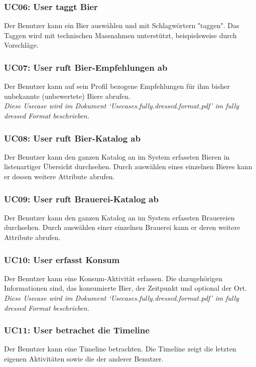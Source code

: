 \documentclass[10pt,a4paper]{scrartcl}
\begin{document}
\subsubsection*{UC06: User taggt Bier}
Der Benutzer kann ein Bier auswählen und mit Schlagwörtern "taggen". Das Taggen wird mit technischen Massnahmen unterstützt, beispielsweise durch Vorschläge.

\subsubsection*{UC07: User ruft Bier-Empfehlungen ab}
Der Benutzer kann auf sein Profil bezogene Empfehlungen für ihm bisher unbekannte (unbewertete) Biere abrufen.\\
\textit{Diese Usecase wird im Dokument `Usecases.fully.dressed.format.pdf' im fully dressed Format beschrieben.}

\subsubsection*{UC08: User ruft Bier-Katalog ab}
Der Benutzer kann den ganzen Katalog an im System erfassten Bieren in listenartiger Übersicht durchsehen. Durch auswählen eines einzelnen Bieres kann er dessen weitere Attribute abrufen.

\subsubsection*{UC09: User ruft Brauerei-Katalog ab}
Der Benutzer kann den ganzen Katalog an im System erfassten Brauereien durchsehen. Durch auswählen einer einzelnen Brauerei kann er deren weitere Attribute abrufen.

\subsubsection*{UC10: User erfasst Konsum}
Der Benutzer kann eine Konsum-Aktivität erfassen. Die dazugehörigen Informationen sind, das konsumierte Bier, der Zeitpunkt und optional der Ort.\\
\textit{Diese Usecase wird im Dokument `Usecases.fully.dressed.format.pdf' im fully dressed Format beschrieben.}

\subsubsection*{UC11: User betrachet die Timeline}
Der Benutzer kann eine Timeline betrachten. Die Timeline zeigt die letzten eigenen Aktivitäten sowie die der anderer Benutzer.
\end{document}
